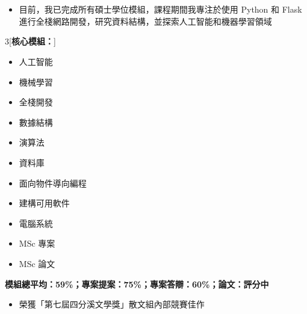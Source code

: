 \documentclass[11 pt,oneside,a4paper,titlepage]{article}
\begin{document}
{\begin{minipage}{13.1cm}
        \noindent
        \section*{}

        {\begin{itemize}[label=\Large\textbullet]
            \item 目前，我已完成所有碩士學位模組，課程期間我專注於使用 Python 和 Flask 進行全棧網路開發，研究資料結構，並探索人工智能和機器學習領域
        \end{itemize}

        \begin{multicols}{3}[\textbf{核心模組：}]
        \begin{itemize}[label=\faCaretRight]
            \item 人工智能
            \item 機械學習
            \item 全棧開發
            \item 數據結構
            \item 演算法
            \item 資料庫
            \item 面向物件導向編程
            \item 建構可用軟件
            \item 電腦系統
            \item MSc 專案
            \item MSc 論文
        \end{itemize}
        \end{multicols}
        \textbf{模組總平均：59\%；專案提案：75\%；專案答辯：60\%；論文：評分中}}

        \vspace*{0.22cm}
            
        {\begin{itemize}[label=\Large\textbullet]
            \item 榮獲「第七屆四分溪文學獎」散文組內部競賽佳作
        \end{itemize}

}
\end{minipage}}
\end{document}
